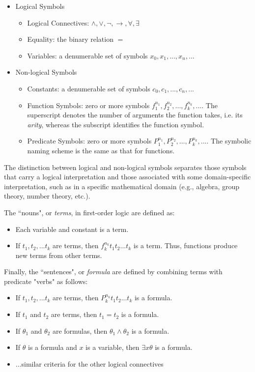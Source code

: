 \begin{itemize}
\item Logical Symbols
\begin{itemize}
\item Logical Connectives: $\wedge, \vee, \lnot, \to, \forall, \exists$
\item Equality: the binary relation $=$
\item Variables: a denumerable set of symbols $x_0, x_1, ..., x_n, ...$
\end{itemize}

\item Non-logical Symbols
\begin{itemize}
\item Constants: a denumerable set of symbols $c_0, c_1, ..., c_n, ...$
\item Function Symbols: zero or more symbols $f^{n_1}_1, f^{n_2}_2, ..., f^{n_k}_k, ...$. The superscript denotes the number of arguments the function takes, i.e. its \textit{arity}, whereas the subscript identifies the function symbol.
\item Predicate Symbols: zero or more symbols $P^{n_1}_1, P^{n_2}_2, ..., P^{n_k}_k, ...$. The symbolic naming scheme is the same as that for functions.
\end{itemize}

\end{itemize}

The distinction between logical and non-logical symbols separates those symbols that carry a logical interpretation and those associated with some domain-specific interpretation, such as in a specific mathematical domain (e.g., algebra, group theory, number theory, etc.).

The ``nouns", or \textit{terms}, in first-order logic are defined as:
\begin{itemize}
\item Each variable and constant is a term.
\item If $t_1, t_2, ... t_k$ are terms, then $f^{n_k}_k t_1 t_2 ... t_k$ is a term. Thus, functions produce new terms from other terms.
\end{itemize}

Finally, the ``sentences", or \textit{formula} are defined by combining terms with predicate "verbs" as follows:
\begin{itemize}
\item If $t_1, t_2, ... t_k$ are terms, then $P^{n_k}_k t_1 t_2 ... t_k$ is a formula.
\item If $t_1$ and $t_2$ are terms, then $t_1 = t_2$ is a formula.
\item If $\theta_1$ and $\theta_2$ are formulas, then $\theta_1 \wedge \theta_2$ is a formula.
\item If $\theta$ is a formula and $x$ is a variable, then $\exists x \theta$ is a formula.
\item ...similar criteria for the other logical connectives
\end{itemize}

